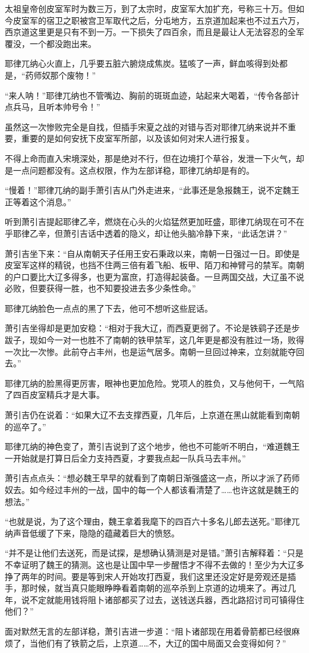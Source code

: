 太祖皇帝创皮室军时为数三万，到了太宗时，皮室军大加扩充，号称三十万。但如今皮室军的宿卫之职被宫卫军取代之后，分屯地方，五京道加起来也不过五六万，西京道这里更是只有不到一万。一下损失了四百余，而且是最让人无法容忍的全军覆没，一个都没跑出来。

耶律兀纳心火直上，几乎要五脏六腑烧成焦炭。猛咳了一声，鲜血咳得到处都是，“药师奴那个废物！”

“来人呐！”耶律兀纳也不管嘴边、胸前的斑斑血迹，站起来大喝着，“传令各部计点兵马，且听本帅号令！”

虽然这一次惨败完全是自找，但插手宋夏之战的对错与否对耶律兀纳来说并不重要，重要的是如何安抚下皮室军所部，以及该如何对宋人进行报复。

不得上命而直入宋境深处，那是绝对不行，但在边境打个草谷，发泄一下火气，却是一点问题都没有。这点权限，作为左部详稳，耶律兀纳却是有的。

“慢着！”耶律兀纳的副手萧引吉从门外走进来，“此事还是急报魏王，说不定魏王正等着这个消息。”

听到萧引吉提起耶律乙辛，燃烧在心头的火焰猛然更加旺盛，耶律兀纳现在可不在乎耶律乙辛，但萧引吉话中透着的隐义，却让他头脑冷静下来，“此话怎讲？”

萧引吉坐下来：“自从南朝天子任用王安石秉政以来，南朝一日强过一日。即使是皮室军这样的精锐，也挡不住两三倍有着飞船、板甲、陌刀和神臂弓的禁军。南朝的户口要比大辽多得多，也更为富庶，打造得起装备。一旦两国交战，大辽虽不说必败，但要获得一胜，也不知要投进去多少条性命。”

耶律兀纳脸色一点点的黑了下去，他可不想听这些屁话。

萧引吉坐得却是更加安稳：“相对于我大辽，而西夏更弱了。不论是铁鹞子还是步跋子，现如今一对一也胜不了南朝的铁甲禁军，这几年更是都没有胜过一场，败得一次比一次惨。此前夺占丰州，也是运气居多。南朝一旦回过神来，立刻就能夺回去。”

耶律兀纳的脸黑得更厉害，眼神也更加危险。党项人的胜负，又与他何干，一气陷了四百皮室精兵才是大事。

萧引吉仍在说着：“如果大辽不去支撑西夏，几年后，上京道在黑山就能看到南朝的巡卒了。”

耶律兀纳的神色变了，萧引吉说到了这个地步，他也不可能听不明白，“难道魏王一开始就是打算日后全力支持西夏，才要我点起一队兵马去丰州。”

萧引吉点点头：“想必魏王早早的就看到了南朝日渐强盛这一点，所以才派了药师奴去。如今经过丰州的一战，国中的每一个人都该看清楚了……也许这就是魏王的想法。”

“也就是说，为了这个理由，魏王拿着我麾下的四百六十多名儿郎去送死。”耶律兀纳声音低缓了下来，隐隐的蕴藏着巨大的愤怒。

“并不是让他们去送死，而是试探，是想确认猜测是对是错。”萧引吉解释着：“只是不幸证明了魏王的猜测。这也是让国中早一步醒悟才不得不去做的！至少为大辽多挣了两年的时间。要是等到宋人开始攻打西夏，我们这里还没定好是旁观还是插手，那时候，就当真只能眼睁睁看着南朝的巡卒杀到上京道的边境来了。再过几年，说不定就能用钱将阻卜诸部都买了过去，送钱送兵器，西北路招讨司可镇得住他们？”

面对默然无言的左部详稳，萧引吉进一步道：“阻卜诸部现在用着骨箭都已经很麻烦了，当他们有了铁箭之后，上京道……不，大辽的国中局面又会变得如何？”

